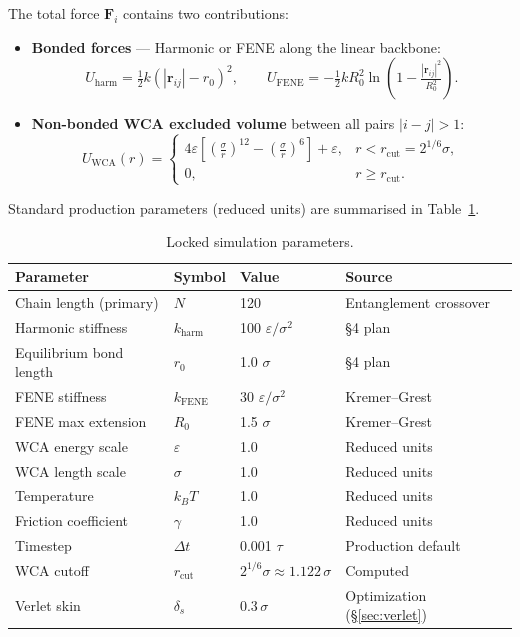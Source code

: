 \documentclass[12pt,a4paper]{article}
\begin{document}
The total force $\mathbf{F}_i$ contains two contributions:
\begin{itemize}
  \item \textbf{Bonded forces} — Harmonic or FENE along the linear backbone:
    \begin{equation}
      U_\text{harm} = \tfrac{1}{2}k(|\mathbf{r}_{ij}|-r_0)^2, \qquad
      U_\text{FENE} = -\tfrac{1}{2}k R_0^2 \ln\!\left(1 - \tfrac{|\mathbf{r}_{ij}|^2}{R_0^2}\right).
    \end{equation}
  \item \textbf{Non-bonded WCA excluded volume} between all pairs $|i-j|>1$:
    \begin{equation}
      U_\text{WCA}(r) =
      \begin{cases}
        4\varepsilon\!\left[\!\left(\tfrac{\sigma}{r}\right)^{\!12}\!-\!\left(\tfrac{\sigma}{r}\right)^{\!6}\right]+\varepsilon, & r < r_\text{cut} = 2^{1/6}\sigma,\\
        0, & r \geq r_\text{cut}.
      \end{cases}
    \end{equation}
\end{itemize}

Standard production parameters (reduced units) are summarised in Table~\ref{tab:params}.

\begin{table}[h]
\centering
\caption{Locked simulation parameters.}
\label{tab:params}
\begin{tabular}{llll}
\toprule
Parameter & Symbol & Value & Source \\
\midrule
Chain length (primary) & $N$ & 120 & Entanglement crossover \\
Harmonic stiffness      & $k_\text{harm}$ & 100 $\varepsilon/\sigma^2$ & §4 plan \\
Equilibrium bond length & $r_0$ & 1.0 $\sigma$ & §4 plan \\
FENE stiffness          & $k_\text{FENE}$ & 30 $\varepsilon/\sigma^2$ & Kremer--Grest \\
FENE max extension      & $R_0$ & 1.5 $\sigma$ & Kremer--Grest \\
WCA energy scale        & $\varepsilon$ & 1.0 & Reduced units \\
WCA length scale        & $\sigma$ & 1.0 & Reduced units \\
Temperature             & $k_BT$ & 1.0 & Reduced units \\
Friction coefficient    & $\gamma$ & 1.0 & Reduced units \\
Timestep                & $\Delta t$ & 0.001 $\tau$ & Production default \\
WCA cutoff              & $r_\text{cut}$ & $2^{1/6}\sigma \approx 1.122\,\sigma$ & Computed \\
Verlet skin             & $\delta_s$ & $0.3\,\sigma$ & Optimization (§\ref{sec:verlet}) \\
\bottomrule
\end{tabular}
\end{table}
\end{document}
